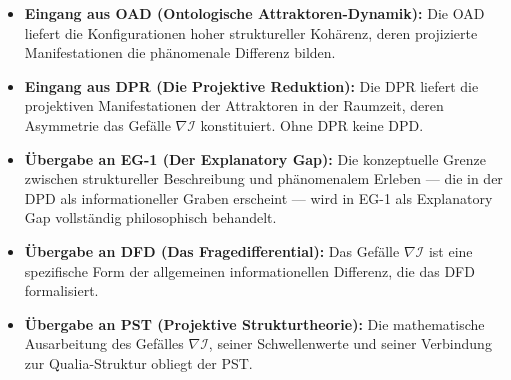 \documentclass[11pt,a4paper]{article}
\theoremstyle{plain}
\theoremstyle{definition}
\begin{document}
\begin{itemize}
  \item \textbf{Eingang aus OAD (Ontologische Attraktoren-Dynamik):} Die OAD liefert
        die Konfigurationen hoher struktureller Koh\"{a}renz, deren projizierte
        Manifestationen die ph\"{a}nomenale Differenz bilden.
  \item \textbf{Eingang aus DPR (Die Projektive Reduktion):} Die DPR liefert die
        projektiven Manifestationen der Attraktoren in der Raumzeit, deren Asymmetrie
        das Gef\"{a}lle $\nabla \mathcal{I}$ konstituiert. Ohne DPR keine DPD.
  \item \textbf{\"{U}bergabe an EG-1 (Der Explanatory Gap):} Die konzeptuelle Grenze
        zwischen struktureller Beschreibung und ph\"{a}nomenalem Erleben --- die in der
        DPD als informationeller Graben erscheint --- wird in EG-1 als Explanatory Gap
        vollst\"{a}ndig philosophisch behandelt.
  \item \textbf{\"{U}bergabe an DFD (Das Fragedifferential):} Das Gef\"{a}lle
        $\nabla \mathcal{I}$ ist eine spezifische Form der allgemeinen informationellen
        Differenz, die das DFD formalisiert.
  \item \textbf{\"{U}bergabe an PST (Projektive Strukturtheorie):} Die mathematische
        Ausarbeitung des Gef\"{a}lles $\nabla \mathcal{I}$, seiner Schwellenwerte und
        seiner Verbindung zur Qualia-Struktur obliegt der PST.
\end{itemize}
\end{document}
